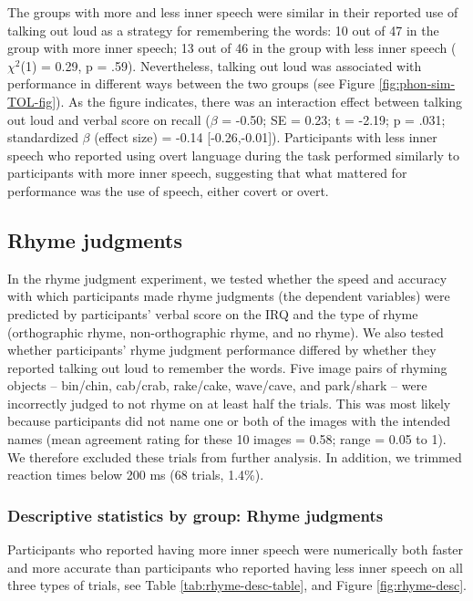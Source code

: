 \documentclass[
  man,a4paper,floatsintext]{apa6}
\begin{document}
The groups with more and less inner speech were similar in their reported use of talking out loud as a strategy for remembering the words: 10 out of 47 in the group with more inner speech; 13 out of 46 in the group with less inner speech (\(\chi^2\)(1) = 0.29, p = .59). Nevertheless, talking out loud was associated with performance in different ways between the two groups (see Figure \ref{fig:phon-sim-TOL-fig}). As the figure indicates, there was an interaction effect between talking out loud and verbal score on recall (\(\beta\) = -0.50; SE = 0.23; t = -2.19; p = .031; standardized \(\beta\) (effect size) = -0.14 {[}-0.26,-0.01{]}). Participants with less inner speech who reported using overt language during the task performed similarly to participants with more inner speech, suggesting that what mattered for performance was the use of speech, either covert or overt.

\hypertarget{rhyme-judgments}{%
\subsection{Rhyme judgments}\label{rhyme-judgments}}

In the rhyme judgment experiment, we tested whether the speed and accuracy with which participants made rhyme judgments (the dependent variables) were predicted by participants' verbal score on the IRQ and the type of rhyme (orthographic rhyme, non-orthographic rhyme, and no rhyme). We also tested whether participants' rhyme judgment performance differed by whether they reported talking out loud to remember the words. Five image pairs of rhyming objects -- bin/chin, cab/crab, rake/cake, wave/cave, and park/shark -- were incorrectly judged to not rhyme on at least half the trials. This was most likely because participants did not name one or both of the images with the intended names (mean agreement rating for these 10 images = 0.58; range = 0.05 to 1). We therefore excluded these trials from further analysis. In addition, we trimmed reaction times below 200 ms (68 trials, 1.4\%).

\hypertarget{descriptive-statistics-by-group-rhyme-judgments}{%
\subsubsection{Descriptive statistics by group: Rhyme judgments}\label{descriptive-statistics-by-group-rhyme-judgments}}

Participants who reported having more inner speech were numerically both faster and more accurate than participants who reported having less inner speech on all three types of trials, see Table \ref{tab:rhyme-desc-table}, and Figure \ref{fig:rhyme-desc}.
\end{document}
